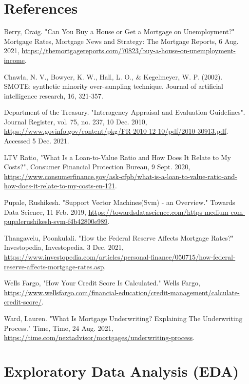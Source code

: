 \documentclass{jpp}
\begin{document}
\section{References}

Berry, Craig. "Can You Buy a House or Get a Mortgage on Unemployment?" Mortgage Rates, Mortgage News and Strategy: The Mortgage Reports, 6 Aug. 2021, \url{https://themortgagereports.com/70823/buy-a-house-on-unemployment-income}.

Chawla, N. V., Bowyer, K. W., Hall, L. O., \& Kegelmeyer, W. P. (2002). SMOTE: synthetic minority over-sampling technique. Journal of artificial intelligence research, 16, 321-357.

Department of the Treasury. "Interagency Appraisal and Evaluation Guidelines". Journal Register, vol. 75, no. 237, 10 Dec. 2010, \url{https://www.govinfo.gov/content/pkg/FR-2010-12-10/pdf/2010-30913.pdf}. Accessed 5 Dec. 2021. 

LTV Ratio, "What Is a Loan-to-Value Ratio and How Does It Relate to My Costs?", Consumer Financial Protection Bureau, 9 Sept. 2020, \url{https://www.consumerfinance.gov/ask-cfpb/what-is-a-loan-to-value-ratio-and-how-does-it-relate-to-my-costs-en-121}. 

Pupale, Rushikesh. "Support Vector Machines(Svm) - an Overview." Towards Data Science, 11 Feb. 2019, \url{https://towardsdatascience.com/https-medium-com-pupalerushikesh-svm-f4b42800e989}.

Thangavelu, Poonkulali. "How the Federal Reserve Affects Mortgage Rates?" Investopedia, Investopedia, 3 Dec. 2021, \url{https://www.investopedia.com/articles/personal-finance/050715/how-federal-reserve-affects-mortgage-rates.asp}. 

Wells Fargo, "How Your Credit Score Is Calculated." Wells Fargo, \url{https://www.wellsfargo.com/financial-education/credit-management/calculate-credit-score/}.

Ward, Lauren. "What Is Mortgage Underwriting? Explaining The Underwriting Process." Time, Time, 24 Aug. 2021, \url{https://time.com/nextadvisor/mortgages/underwriting-process}.

\appendix

\section{Exploratory Data Analysis (EDA)}\label{EDA}
\end{document}
